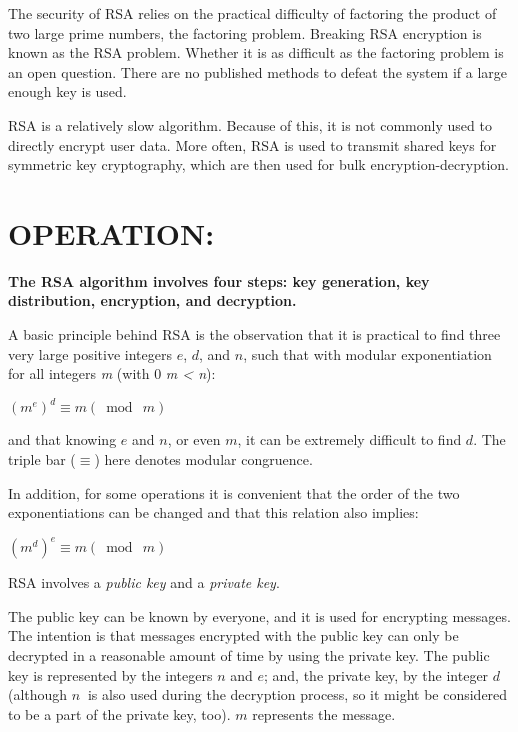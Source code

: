 \documentclass[12pt,fleqn]{article}
\begin{document}
The security of RSA relies on the practical difficulty of factoring
the product of two large prime numbers, the \textquotedbl factoring
problem\textquotedbl . Breaking RSA encryption is known as the RSA
problem. Whether it is as difficult as the factoring problem is an
open question. There are no published methods to defeat the system
if a large enough key is used.

RSA is a relatively slow algorithm. Because of this, it is not commonly
used to directly encrypt user data. More often, RSA is used to transmit
shared keys for symmetric key cryptography, which are then used for
bulk encryption-decryption.

\pagebreak{}

\section{OPERATION:}
\begin{center}
\textbf{The RSA algorithm involves four steps: key generation, key
distribution, encryption, and decryption.}
\par\end{center}

\smallskip{}

A basic principle behind RSA is the observation that it is practical
to find three very large positive integers $e$, $d$, and $n$, such
that with modular exponentiation for all integers \textit{m} (with
0 \leq\textit{ m < n}):

$(m^e)^d \equiv m (\bmod\:m)$

and that knowing $e$ and $n$, or even $m$, it can be extremely
difficult to find $d$. The triple bar ($\equiv$) here denotes modular
congruence.

In addition, for some operations it is convenient that the order of
the two exponentiations can be changed and that this relation also
implies:

$(m^d)^e \equiv m (\bmod\:m)$

\smallskip{}

\begin{center}
RSA involves a \textit{public key} and a \textit{private key}. 
\par\end{center}

The public key can be known by everyone, and it is used for encrypting
messages. The intention is that messages encrypted with the public
key can only be decrypted in a reasonable amount of time by using
the private key. The public key is represented by the integers $n$
and $e$; and, the private key, by the integer $d\:$ (although $n\:$
is also used during the decryption process, so it might be considered
to be a part of the private key, too). $m$ represents the message.
\end{document}
